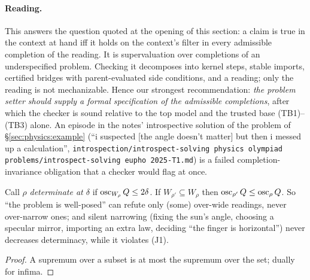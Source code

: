 \paragraph{Reading.} This answers the question quoted at the opening of this section: a
claim is true in the context at hand iff it holds on the context's filter in every
admissible completion of the reading. It is supervaluation \citep{fine1975vagueness} over
completions of an underspecified problem. Checking it decomposes into kernel steps, stable
imports, certified bridges with parent-evaluated side conditions, and a reading; only the
reading is not mechanizable. Hence our strongest recommendation: \emph{the problem setter
should supply a formal specification of the admissible completions}, after which the
checker is sound relative to the top model and the trusted base (TB1)--(TB3) alone. An
episode in the notes' introspective solution of the problem of
\S\ref{sec:physics:example} (``i suspected [the angle doesn't matter] but then i messed up a
calculation'', \texttt{introspection/introspect-solving physics olympiad
problems/introspect-solving eupho 2025-T1.md}) is a failed completion-invariance obligation
that a checker would flag at once.

\begin{proposition}\label{prop:physics:gricean}
Call $\rho$ \emph{determinate at $\delta$} if $\operatorname{osc}_{W_\rho}Q\le2\delta$. If
$W_{\rho'}\subseteq W_\rho$ then $\operatorname{osc}_{\rho'}Q\le\operatorname{osc}_\rho Q$. So ``the problem is well-posed''
can refute only (some) over-wide readings, never over-narrow ones; and silent narrowing
(fixing the sun's angle, choosing a specular mirror, importing an extra law, deciding ``the
finger is horizontal'') never decreases determinacy, while it violates (J1).
\end{proposition}
\begin{proof}
A supremum over a subset is at most the supremum over the set; dually for infima.
\end{proof}

